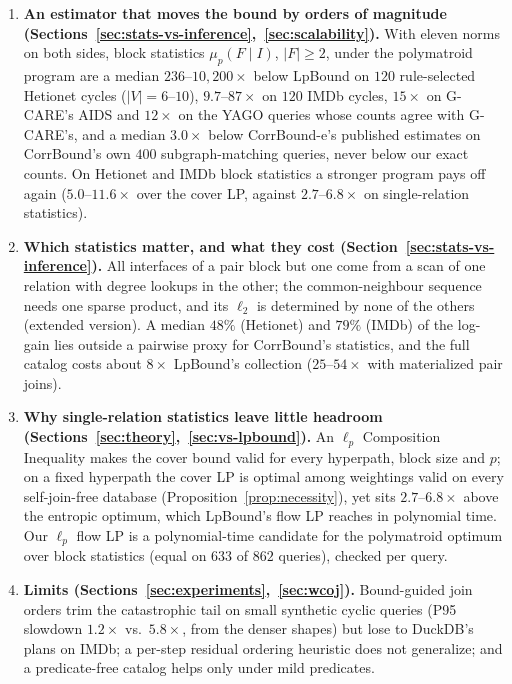 \documentclass[sigconf, nonacm, acmthm=false]{acmart}
\newcommand{\block}{F}
\newcommand{\interface}{I}
\begin{document}
\begin{enumerate}
\item \textbf{An estimator that moves the bound by orders of magnitude
(Sections~\ref{sec:stats-vs-inference},~\ref{sec:scalability}).}
With eleven norms on both sides, block statistics
$\mu_p(\block\mid\interface)$, $|\block|\ge2$, under the polymatroid
program are a median $236$--$10{,}200\times$ below LpBound on $120$
rule-selected Hetionet cycles ($|V|{=}6$--$10$), $9.7$--$87\times$ on
$120$ IMDb cycles, $15\times$ on G-CARE's AIDS and $12\times$ on the YAGO
queries whose counts agree with G-CARE's, and a median $3.0\times$
below CorrBound-e's published estimates on CorrBound's own $400$
subgraph-matching queries, never below our exact counts. On Hetionet and IMDb block
statistics a stronger program pays off again ($5.0$--$11.6\times$ over the
cover LP, against $2.7$--$6.8\times$ on single-relation statistics).

\item \textbf{Which statistics matter, and what they cost
(Section~\ref{sec:stats-vs-inference}).}
All interfaces of a pair block but one come from a scan of one relation
with degree lookups in the other; the common-neighbour sequence needs one
sparse product, and its $\ell_2$ is determined by none of the others
(extended version). A median $48\%$ (Hetionet) and $79\%$ (IMDb) of the
log-gain lies outside a pairwise proxy for CorrBound's statistics, and the
full catalog costs about $8\times$ LpBound's collection ($25$--$54\times$
with materialized pair joins).

\item \textbf{Why single-relation statistics leave little headroom
(Sections~\ref{sec:theory},~\ref{sec:vs-lpbound}).}
An $\ell_p$ Composition Inequality makes the cover bound valid for every
hyperpath, block size and $p$; on a fixed hyperpath the cover LP is optimal
among weightings valid on every self-join-free database
(Proposition~\ref{prop:necessity}), yet sits $2.7$--$6.8\times$ above the
entropic optimum, which LpBound's flow LP reaches in polynomial time. Our
$\ell_p$ flow LP is a polynomial-time candidate for the polymatroid
optimum over block statistics (equal on $633$ of $862$ queries), checked
per query.

\item \textbf{Limits (Sections~\ref{sec:experiments},~\ref{sec:wcoj}).}
Bound-guided join orders trim the catastrophic tail on small synthetic
cyclic queries (P95 slowdown $1.2\times$ vs.\ $5.8\times$, from the denser
shapes) but lose to DuckDB's plans on IMDb; a per-step residual ordering
heuristic does not generalize; and a predicate-free catalog helps only
under mild predicates.
\end{enumerate}
\end{document}
